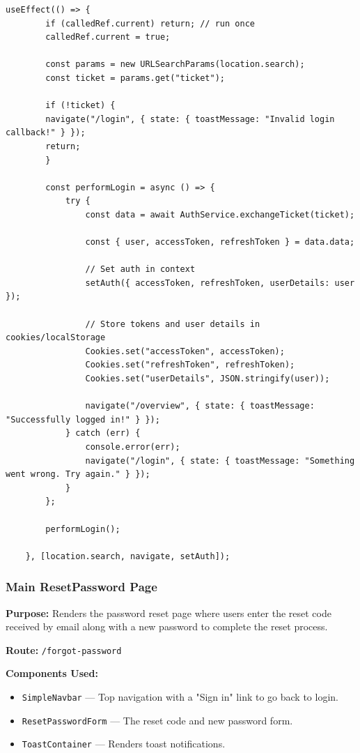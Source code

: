 \begin{lstlisting}
useEffect(() => {
        if (calledRef.current) return; // run once
        calledRef.current = true;

        const params = new URLSearchParams(location.search);
        const ticket = params.get("ticket");

        if (!ticket) {
        navigate("/login", { state: { toastMessage: "Invalid login callback!" } });
        return;
        }

        const performLogin = async () => {
            try {
                const data = await AuthService.exchangeTicket(ticket);

                const { user, accessToken, refreshToken } = data.data;

                // Set auth in context
                setAuth({ accessToken, refreshToken, userDetails: user });

                // Store tokens and user details in cookies/localStorage
                Cookies.set("accessToken", accessToken);
                Cookies.set("refreshToken", refreshToken);
                Cookies.set("userDetails", JSON.stringify(user));

                navigate("/overview", { state: { toastMessage: "Successfully logged in!" } });
            } catch (err) {
                console.error(err);
                navigate("/login", { state: { toastMessage: "Something went wrong. Try again." } });
            }
        };

        performLogin();

    }, [location.search, navigate, setAuth]);
\end{lstlisting}

\subsubsection{Main ResetPassword Page}

\textbf{Purpose:} Renders the password reset page where users enter the reset code received by email along with a new password to complete the reset process.

\vspace{0.2cm}
\noindent\textbf{Route:} \texttt{/forgot-password}

\vspace{0.2cm}
\noindent\textbf{Components Used:}
\begin{itemize}
    \item \texttt{SimpleNavbar} --- Top navigation with a "Sign in" link to go back to login.
    \item \texttt{ResetPasswordForm} --- The reset code and new password form.
    \item \texttt{ToastContainer} --- Renders toast notifications.
\end{itemize}

